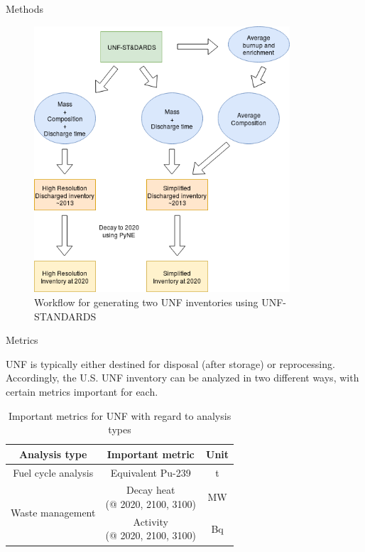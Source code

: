 \documentclass[final]{beamer}
\newlength{\onecolwid}
\newlength{\threecolwid}
\begin{document}
\begin{frame}[t]
\begin{columns}[t,totalwidth=\threecolwid]
\begin{column}{\onecolwid}
\begin{block}{Methods}
\begin{figure}
    \includegraphics[width=0.85\textwidth]{../images/flow.png}
    \caption{Workflow for generating two \gls{UNF} inventories using \gls{UNF-STANDARDS}}
    \label{fig:flow}
\end{figure}

\end{block}

\begin{block}{Metrics}

\gls{UNF} is typically either destined for disposal (after storage) or reprocessing.
Accordingly, the U.S. \gls{UNF} inventory can be analyzed in two different
ways, with certain metrics important for each.

\begin{table}[h]
    \centering
    \begin{tabular}{ccc}
        \hline
        Analysis type & Important metric & Unit\\
        \hline
        Fuel cycle analysis & Equivalent Pu-239 \cite{anon_plutonium_1989} & t \\
        \hline
        \multirow{2}{*}{Waste management} & \shortstack{Decay heat \\ (@ 2020, 2100, 3100)} & MW\\
        & \shortstack{Activity \\ (@ 2020, 2100, 3100)} & Bq \\
        \hline
    \end{tabular}
    \caption{Important metrics for \gls{UNF} with regard to analysis types }
    \label{tab:met}
\end{table}


\end{block}
\end{column}
\end{columns}
\end{frame}
\end{document}
